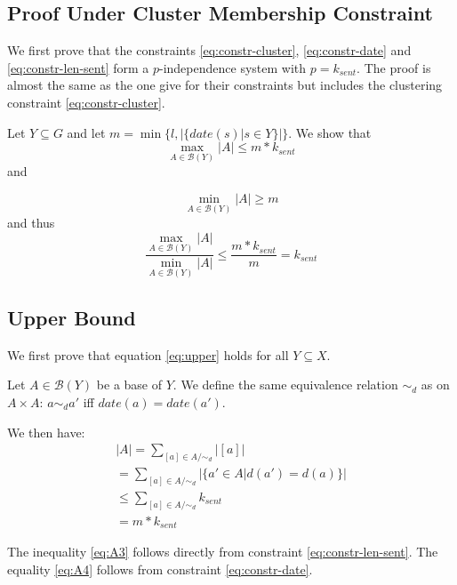 \documentclass[a4paper,BCOR=10mm]{report}
\numberwithin{lemma}{chapter}
\numberwithin{definition}{chapter}
\begin{document}
\begin{appendices}
\section{Proof Under Cluster Membership Constraint} \label{sec:proof-cluster-constr}

We first prove that the constraints \ref{eq:constr-cluster}, \ref{eq:constr-date} and \ref{eq:constr-len-sent} form a $p$-independence system with $p = k_{sent}$.
The proof is almost the same as the one \citet{markert} give for their constraints but includes the clustering constraint \ref{eq:constr-cluster}.

Let $Y \subseteq G$ and let $m = \min \{ l, |\{\mathit{date}(s) | s \in Y\}| \}$.
We show that 
\begin{equation}
\max_{A \in \mathcal{B}(Y)} |A| \leq m * k_{sent} \label{eq:upper}
\end{equation}
 and

\begin{equation}
\min_{A \in \mathcal{B}(Y)} |A| \geq m \label{eq:lower}
\end{equation}
and thus 
\begin{equation}
\frac{\max_{A \in \mathcal{B}(Y)} |A|}{\min_{A \in \mathcal{B}(Y)} |A|}
\leq \frac{m * k_{sent}}{m} = k_{sent}    
\end{equation}

\subsection{Upper Bound} \label{sec:cluster-upper-bound}

We first prove that equation \ref{eq:upper} holds for all $Y \subseteq X$.

Let $A \in \mathcal{B}(Y)$ be a base of $Y$. We define the same equivalence relation $\sim_d$ as \citeauthor{markert} on $A \times A$:
$a \sim_d a'$ iff $\mathit{date}(a) = \mathit{date}(a')$.

We then have:
\begin{align}
|A| = \sum_{[a] \in A/\sim_d} |[a]| \\
    = \sum_{[a] \in A/\sim_d} |\{ a' \in A | d(a') = d(a) \}| \label{eq:A2} \\
    \leq \sum_{[a] \in A/\sim_d} k_{sent} \label{eq:A3} \\
    = m * k_{sent} \label{eq:A4}
\end{align}

The inequality \ref{eq:A3} follows directly from constraint \ref{eq:constr-len-sent}.
The equality \ref{eq:A4} follows from constraint \ref{eq:constr-date}.



\end{appendices}
\end{document}
